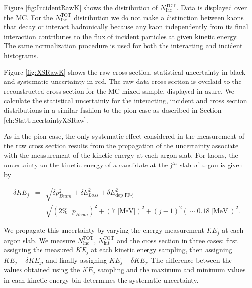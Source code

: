 Figure \ref{fig:IncidentRawK} shows the distribution of  $N^{\text{TOT}}_{\text{Inc}}$. Data is displayed over the MC. For the  $N^{\text{TOT}}_{\text{Inc}}$ distribution we do not make a distinction between kaons that decay or interact hadronically because any kaon independently from its final interaction contributes to the flux of incident particles at given kinetic energy.
The same normalization procedure is used for both the interacting and incident histograms. 


Figure \ref{fig:XSRawK} shows the raw cross section, statistical uncertainty in black and systematic uncertainty in red. The raw data cross section is overlaid to the reconstructed cross section for the MC mixed sample, displayed in azure.  We calculate the statistical uncertainty for the interacting, incident and cross section distributions in a similar fashion to the pion case as described in Section \ref{ch:StatUncertaintyXSRaw}. 

As in the pion case, the only systematic effect considered in the measurement of the raw cross section results from the propagation of the uncertainty associate with the measurement of the kinetic energy at each argon slab. For kaons, the uncertainty on the kinetic energy of a candidate at the j$^{th}$ slab of argon  is given by

\begin{eqnarray}
\delta KE_{j} &=& \sqrt{\delta p_{Beam}^2 + \delta E_{Loss}^2 +  \delta  E_{\text{dep FF-j}}^2}\\
&=& \sqrt{(2\% \text{ }p_{Beam})^2 +  (7 \text{ [MeV]})^2 +  (j-1)^2 (\sim0.18\text{ [MeV]})^2}.
\end{eqnarray}

We propagate this uncertainty  by varying the energy measurement $KE_{j}$ at each argon slab. We measure $N^{\text{TOT}}_{\text{Inc}}$,  $N^{\text{TOT}}_{\text{Int}}$ and the cross section  in three cases: first assigning the measured $KE_{j}$ at each kinetic energy sampling, then assigning $KE_{j} + \delta KE_{j}$, and finally assigning $KE_{j} - \delta KE_{j}$. The difference between the values obtained using the $KE_{j}$ sampling and the maximum and minimum values in each kinetic energy bin determines the systematic uncertainty.

